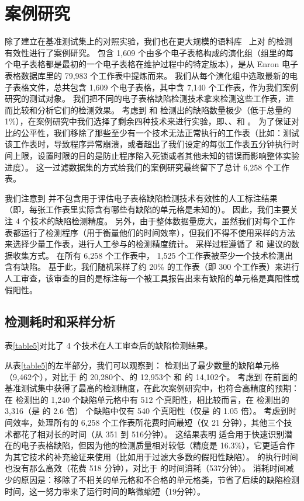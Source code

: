 \section{案例研究}
除了建立在基准测试集上的对照实验，我们也在更大规模的语料库 \ven~\cite{xu2017spreadcluster}上对 \wa 的检测有效性进行了案例研究。
\ven 包含 1,609 个由多个电子表格构成的演化组（组里的每个电子表格都是最初的一个电子表格在维护过程中的特定版本），是从 Enron 电子表格数据库\cite{hermans2015enron}里的 79,983 个工作表中提炼而来。
我们从每个演化组中选取最新的电子表格文件，总共包含 1,609 个电子表格，其中含 7,140 个工作表，作为我们案例研究的测试对象。
我们把不同的电子表格缺陷检测技术拿来检测这些工作表，进而比较和分析它们的检测效果。
考虑到 \uc 和 \di 检测出的缺陷数量极少（低于总量的 1\%），在案例研究中我们选择了剩余四种技术来进行实验，即\am 、\ca、\cu 和 \wa。
为了保证对比的公平性，我们移除了那些至少有一个技术无法正常执行的工作表（比如：测试该工作表时，导致程序异常崩溃，或者超出了我们设定的每张工作表五分钟执行时间上限，设置时限的目的是防止程序陷入死锁或者其他未知的错误而影响整体实验进度）。
这一过滤数据集的方式给我们的案例研究最终留下了总计 6,258 个工作表。

我们注意到 \ven 并不包含用于评估电子表格缺陷检测技术有效性的人工标注结果（即，每张工作表里实际含有哪些有缺陷的单元格是未知的）。
因此，我们主要关注 4 个技术的缺陷检测精度。
另外，由于整体数据量庞大，虽然我们对每个工作表都运行了检测程序（用于衡量他们的时间效率），但我们不得不使用采样的方法来选择少量工作表，进行人工参与的检测精度统计。
采样过程遵循了 \am 和 \cu 建议的数据收集方式。
在所有 6,258 个工作表中， 1,525 个工作表被至少一个技术检测出含有缺陷。
基于此，我们随机采样了约 20\% 的工作表（即 300 个工作表）来进行人工审查，该审查的目的是标注每一个被工具报告出来有缺陷的单元格是真阳性或假阳性。

\subsection{检测耗时和采样分析}
表\ref{table5}对比了 4 个技术在人工审查后的缺陷检测结果。

从表\ref{table5}的左半部分，我们可以观察到：
\wa 检测出了最少数量的缺陷单元格（9,462个），对比于 \am 的 20,280个、\ca 的 12,953个 和 \cu 的 14,102个。
考虑到 \wa 在前面的基准测试集中获得了最高的检测精度，在此次案例研究中，\wa 也符合高精度的预期：在 \wa 检测出的 1,240 个缺陷单元格中有 512 个真阳性，相比较而言，在 \am 检测出的 3,316（是 \wa 的 2.6 倍） 个缺陷中仅有 540 个真阳性（仅是 \wa 的 1.05 倍）。
考虑到时间效率，\am 处理所有的 6,258 个工作表所花费时间最短（仅 21 分钟），其他三个技术都花了相对长的时间（从 351 到 516分钟）。
这结果表明 \am 适合用于快速识别潜在的电子表格缺陷，但因为他的检测质量相对较低（精度是 16.3\%），它更适合作为其它技术的补充验证来使用（比如用于过滤大多数的假阳性缺陷）。
\wa 的执行时间也没有那么高效（花费 518 分钟），对比于 \cu 的时间消耗（537分钟）。
消耗时间减少的原因是：\wa 移除了不相关的单元格和不合格的单元格类，节省了后续的缺陷检测时间，这一努力带来了运行时间的略微缩短（19分钟）。

